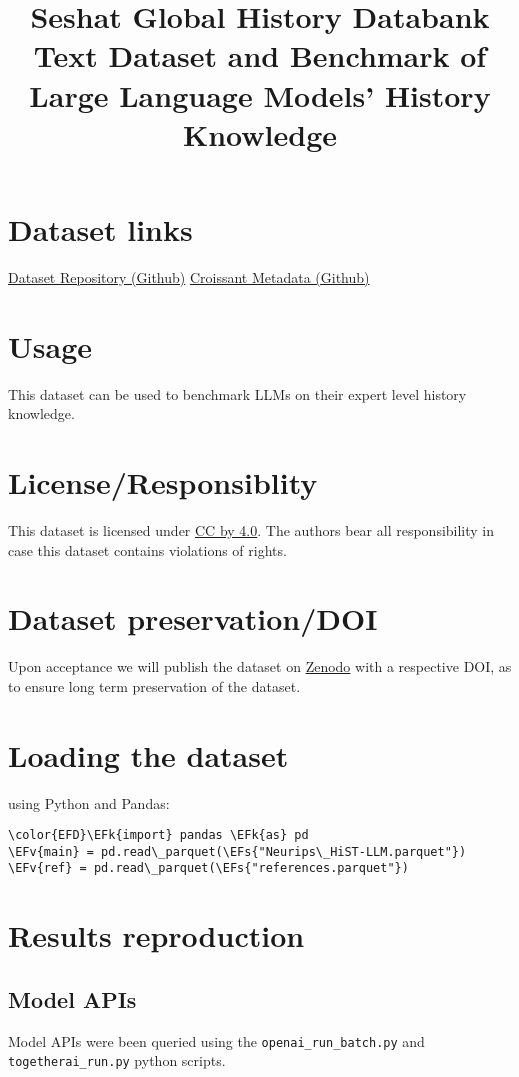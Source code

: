 \documentclass[11pt]{article}
\date{}
\title{Seshat Global History Databank Text Dataset and Benchmark of Large Language Models' History Knowledge}
\newcommand{\EFs}[1]{\textcolor{EFs}{#1}} %
\newcommand{\EFk}[1]{\textcolor{EFk}{#1}} %
\newcommand{\EFv}[1]{\textcolor{EFv}{#1}} %
\begin{document}
\maketitle

\section*{Dataset links}
\label{sec:orge7fd454}
\href{https://github.com/seshat-db/HiST-LLM}{Dataset Repository (Github)} 
\href{https://github.com/seshat-db/HiST-LLM/blob/main/croissant.json}{Croissant Metadata (Github)}
\section*{Usage}
\label{sec:org96473fc}
This dataset can be used to benchmark LLMs on their expert level history knowledge.
\section*{License/Responsiblity}
\label{sec:org57c06eb}
This dataset is licensed under \href{https://creativecommons.org/licenses/by/4.0/}{CC by 4.0}.
The authors bear all responsibility in case this dataset contains violations of rights.
\section*{Dataset preservation/DOI}
\label{sec:org78b8f01}
Upon acceptance we will publish the dataset on \href{https://zenodo.org/}{Zenodo} with a respective DOI, as to ensure long term preservation of the dataset.
\section*{Loading the dataset}
\label{sec:org8f58437}
using Python and Pandas:
\begin{Code}
\begin{Verbatim}
\color{EFD}\EFk{import} pandas \EFk{as} pd
\EFv{main} = pd.read\_parquet(\EFs{"Neurips\_HiST-LLM.parquet"})
\EFv{ref} = pd.read\_parquet(\EFs{"references.parquet"})
\end{Verbatim}
\end{Code}
\section*{Results reproduction}
\label{sec:orgded3951}
\subsection*{Model APIs}
\label{sec:orgc849e2d}
Model APIs were been queried using the \texttt{openai\_run\_batch.py} and \texttt{togetherai\_run.py} python scripts.
\end{document}
